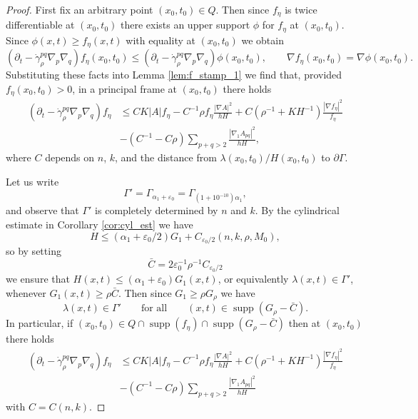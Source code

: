 \documentclass[12pt]{amsart}
\DeclareMathOperator{\supp}{supp}
\begin{document}
\begin{proof}
First fix an arbitrary point $(x_0,t_0) \in Q$. Then since $f_\eta$ is twice differentiable at $(x_0,t_0)$ there exists an upper support $\phi$ for $f_\eta$ at $(x_0,t_0)$. Since $\phi(x,t) \geq f_\eta(x,t)$ with equality at $(x_0,t_0)$ we obtain 
\[(\partial_t - \dot \gamma^{pq}_\rho \nabla_p \nabla_q)f_\eta (x_0,t_0) \leq (\partial_t -\dot \gamma_\rho^{pq} \nabla_p \nabla_q) \phi(x_0,t_0), \qquad \nabla f_\eta(x_0,t_0) = \nabla \phi(x_0,t_0).\]
Substituting these facts into Lemma \ref{lem:f_stamp_1} we find that, provided $f_\eta(x_0,t_0)>0$, in a principal frame at $(x_0,t_0)$ there holds 
\begin{align*}
(\partial_t - \dot \gamma_\rho^{pq} \nabla_p \nabla_q) f_\eta & \leq CK|A| f_\eta - C^{-1} \rho f_\eta \frac{|\nabla A|^2}{hH} + C(\rho^{-1} + KH^{-1} )  \frac{|\nabla f_\eta|^2}{ f_\eta}\\
&-(C^{-1}- C \rho) \sum_{p+q> 2} \frac{|\nabla_1 A_{pq}|^2}{h H},
\end{align*}
where $C$ depends on $n$, $k$, and the distance from $\lambda(x_0,t_0)/H(x_0,t_0)$ to $\partial \Gamma$. 

Let us write 
\[\Gamma' = \Gamma_{\alpha_1 + \varepsilon_0} = \Gamma_{(1+10^{-10})\alpha_1},\]
and observe that $\Gamma'$ is completely determined by $n$ and $k$. By the cylindrical estimate in Corollary \ref{cor:cyl_est} we have 
\[H \leq (\alpha_1 + \varepsilon_0/2) G_1 + C_{\varepsilon_0/2}(n,k,\rho, M_0),\]
so by setting 
\[\bar C = 2 \varepsilon_0^{-1} \rho^{-1} C_{\varepsilon_0/2}\]
we ensure that $H(x,t) \leq (\alpha_1 +\varepsilon_0) G_1(x,t)$, or equivalently $\lambda(x,t) \in \Gamma'$, whenever $G_1(x,t) \geq \rho\bar C$. Then since $G_1 \geq \rho G_\rho$ we have 
\[\lambda(x,t) \in \Gamma' \qquad \text{for all} \qquad (x,t) \in \supp(G_\rho -\bar C).\]
In particular, if $(x_0,t_0) \in Q \cap \supp(f_\eta) \cap \supp(G_\rho - \bar C)$ then at $(x_0,t_0)$ there holds 
\begin{align*}
(\partial_t - \dot \gamma_\rho^{pq} \nabla_p \nabla_q) f_\eta & \leq CK|A| f_\eta - C^{-1} \rho f_\eta \frac{|\nabla A|^2}{hH} + C(\rho^{-1} + KH^{-1} )  \frac{|\nabla f_\eta|^2}{ f_\eta}\\
&-(C^{-1}- C \rho) \sum_{p+q> 2} \frac{|\nabla_1 A_{pq}|^2}{h H}
\end{align*}
with $C = C(n,k)$. 


\end{proof}
\end{document}
